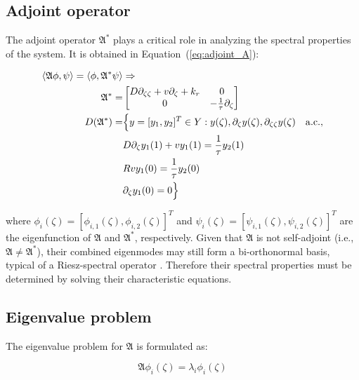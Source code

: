 \subsection{Adjoint operator}

The adjoint operator $\mathfrak{A}^*$ plays a critical role in analyzing the spectral properties of the system. It is obtained in Equation~(\ref{eq:adjoint_A}):

\begin{equation} \label{eq:adjoint_A}
    \begin{aligned}
        \langle \mathfrak{A} \phi, \psi\rangle  = \langle \phi, {\mathfrak{A}}^{*} \psi\rangle  &\Rightarrow \\
        {\mathfrak{A}}^{*} =&
        \begin{bmatrix}
            D \partial_{\zeta \zeta} + v \partial_\zeta +k_r & 0\\
            0 & -\frac{1}{\tau} \partial_\zeta
        \end{bmatrix}\\
        D(\mathfrak{A}^*) =& \Bigl\{ y = [y_1, y_2]^T \in Y:
        y(\zeta), \partial_\zeta y(\zeta), \partial_{\zeta \zeta} y(\zeta) \quad \mathrm{a.c.},\\
        &D \partial_\zeta y_1(1) + v y_1(1) = \frac{1}{\tau} y_2(1) \\
        &R v y_1(0) = \frac{1}{\tau} y_2(0) \\
        &\partial_\zeta y_1(0) = 0 \Bigr\}
    \end{aligned}
\end{equation}

where $\phi_i(\zeta) = [\phi_{i,1}(\zeta), \phi_{i,2}(\zeta)]^T$ and $\psi_i(\zeta) = [\psi_{i,1}(\zeta), \psi_{i,2}(\zeta)]^T$ are the eigenfunction of $\mathfrak{A}$ and $\mathfrak{A}^*$, respectively. Given that $\mathfrak{A}$ is not self-adjoint (i.e., $\mathfrak{A} \neq \mathfrak{A}^*$), their combined eigenmodes may still form a bi-orthonormal basis, typical of a Riesz-spectral operator \autocite{curtainbook}. Therefore their spectral properties must be determined by solving their characteristic equations.

\subsection{Eigenvalue problem}

The eigenvalue problem\autocite{pdebook} for $\mathfrak{A}$ is formulated as:

\begin{equation} \label{eq:eig_prob}
        \mathfrak{A} \phi_i(\zeta) = \lambda_i \phi_i(\zeta)
\end{equation}

